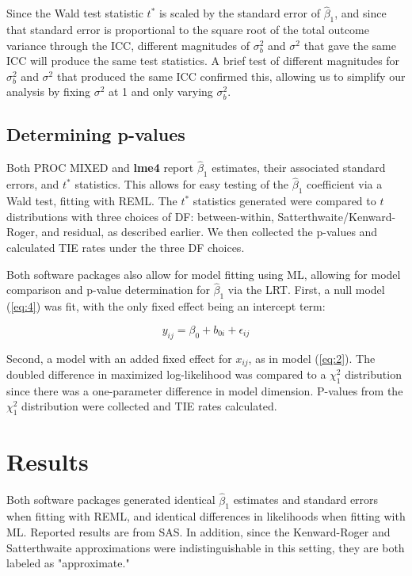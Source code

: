 \documentclass[twocolumn]{bmcart}%
\begin{document}
Since the Wald test statistic $t^*$ is scaled by the standard error of $\hat{\beta}_1$, and since that standard error is proportional to the square root of the total outcome variance through the ICC, different magnitudes of $\sigma_b^2$ and $\sigma^2$ that gave the same ICC will produce the same test statistics. A brief test of different magnitudes for $\sigma_b^2$ and $\sigma^2$ that produced the same ICC confirmed this, allowing us to simplify our analysis by fixing $\sigma^2$ at 1 and only varying $\sigma^2_b$.


\subsection*{Determining p-values}

Both PROC MIXED and \textbf{lme4} report $\hat{\beta}_1$ estimates, their associated standard errors, and $t^*$ statistics. This allows for easy testing of the $\hat{\beta}_1$ coefficient via a Wald test, fitting with REML. The $t^*$ statistics generated were compared to $t$ distributions with three choices of DF: between-within, Satterthwaite/Kenward-Roger, and residual, as described earlier. We then collected the p-values and calculated TIE rates under the three DF choices.

Both software packages also allow for model fitting using ML, allowing for model comparison and p-value determination for $\hat{\beta}_1$ via the LRT. First, a null model (\ref{eq:4}) was fit, with the only fixed effect being an intercept term:

\begin{equation}
  \label{eq:4}
  y_{ij} = \beta_0 + b_{0i} + \epsilon_{ij}
\end{equation}

Second, a model with an added fixed effect for $x_{ij}$, as in model (\ref{eq:2}). The doubled difference in maximized log-likelihood was compared to a $\chi^2_1$ distribution since there was a one-parameter difference in model dimension. P-values from the $\chi^2_1$ distribution were collected and TIE rates calculated.


\section*{Results}

Both software packages generated identical $\hat{\beta}_1$ estimates and standard errors when fitting with REML, and identical differences in likelihoods when fitting with ML. Reported results are from SAS. In addition, since the Kenward-Roger and Satterthwaite approximations were indistinguishable in this setting, they are both labeled as "approximate."
\end{document}
